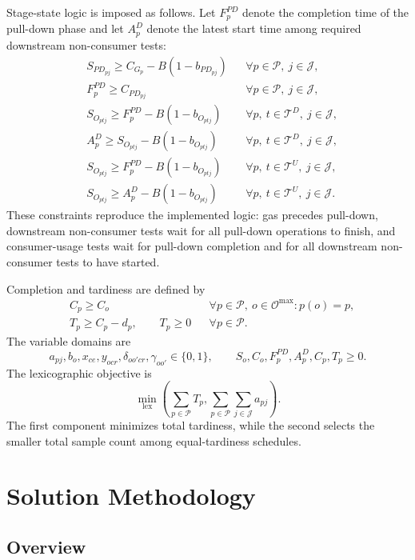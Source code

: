 \documentclass[11pt]{article}
\begin{document}
Stage-state logic is imposed as follows. Let \(F_p^{PD}\) denote the completion time of the pull-down phase and let \(A_p^D\) denote the latest start time among required downstream non-consumer tests:
\begin{align}
& S_{PD_{pj}}\ge C_{G_p}-B(1-b_{PD_{pj}})
&& \forall p\in\mathcal{P},\ j\in\mathcal{J},\\
& F_p^{PD}\ge C_{PD_{pj}}
&& \forall p\in\mathcal{P},\ j\in\mathcal{J},\\
& S_{O_{ptj}}\ge F_p^{PD}-B(1-b_{O_{ptj}})
&& \forall p,\ t\in\mathcal{T}^{D},\ j\in\mathcal{J},\\
& A_p^D\ge S_{O_{ptj}}-B(1-b_{O_{ptj}})
&& \forall p,\ t\in\mathcal{T}^{D},\ j\in\mathcal{J},\\
& S_{O_{ptj}}\ge F_p^{PD}-B(1-b_{O_{ptj}})
&& \forall p,\ t\in\mathcal{T}^{U},\ j\in\mathcal{J},\\
& S_{O_{ptj}}\ge A_p^D-B(1-b_{O_{ptj}})
&& \forall p,\ t\in\mathcal{T}^{U},\ j\in\mathcal{J}.
\end{align}
These constraints reproduce the implemented logic: gas precedes pull-down, downstream non-consumer tests wait for all pull-down operations to finish, and consumer-usage tests wait for pull-down completion and for all downstream non-consumer tests to have started.

Completion and tardiness are defined by
\begin{align}
& C_p\ge C_o && \forall p\in\mathcal{P},\ o\in\mathcal{O}^{\max}:p(o)=p,\\
& T_p\ge C_p-d_p,\qquad T_p\ge 0 && \forall p\in\mathcal{P}.
\end{align}
The variable domains are
\[
a_{pj},b_o,x_{ce},y_{ocr},\delta_{oo'cr},\gamma_{oo'}\in\{0,1\},
\qquad
S_o,C_o,F_p^{PD},A_p^D,C_p,T_p\ge 0.
\]
The lexicographic objective is
\[
\min_{\mathrm{lex}}
\left(
\sum_{p\in\mathcal{P}}T_p,
\sum_{p\in\mathcal{P}}\sum_{j\in\mathcal{J}}a_{pj}
\right).
\]
The first component minimizes total tardiness, while the second selects the smaller total sample count among equal-tardiness schedules.

\section{Solution Methodology}
\label{sec:solution}

\subsection{Overview}
\label{subsec:framework}
\end{document}

